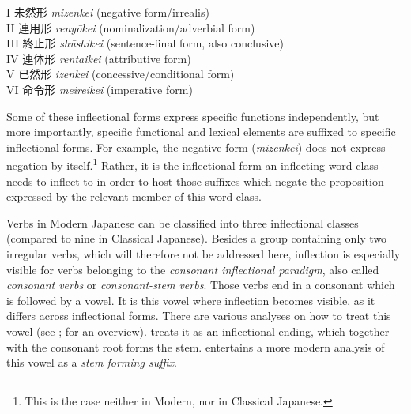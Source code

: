 \documentclass[output=paper,colorlinks,citecolor=brown]{langscibook}
\begin{document}
\begin{exe}
	\ex \label{12ex6}
		I \hspace*{0.6cm} {\japanesefont 未然形} \hspace*{0.6cm} \emph{mizenkei} \hfill (negative form/irrealis) \\
		II \hspace*{0.5cm} {\japanesefont 連用形} \hspace*{0.6cm} \emph{renyōkei} \hfill (nominalization/adverbial form) \\
		III \hspace*{0.4cm} {\japanesefont 終止形} \hspace*{0.6cm} \emph{shūshikei} \hfill (sentence-final form, also conclusive) \\
		IV \hspace*{0.4cm} {\japanesefont 連体形} \hspace*{0.58cm} \emph{rentaikei} \hfill (attributive form) \\
		V \hspace*{0.54cm} {\japanesefont 已然形} \hspace*{0.56cm} \emph{izenkei} \hfill (concessive/conditional form) \\
		VI \hspace*{0.45cm} {\japanesefont 命令形} \hspace*{0.53cm} \emph{meireikei} \hfill (imperative form)
\end{exe}

Some of these inflectional forms express specific functions independently, but more importantly, specific functional and lexical elements are suffixed to specific inflectional forms. For example, the negative form (\emph{mizenkei}) does not express negation by itself.\footnote{This is the case neither in Modern, nor in Classical Japanese.} Rather, it is the inflectional form an inflecting word class needs to inflect to in order to host those suffixes which negate the proposition expressed by the relevant member of this word class.

Verbs in Modern Japanese can be classified into three inflectional classes (compared to nine in Classical Japanese). Besides a group containing only two irregular verbs, which will therefore not be addressed here, inflection is especially visible for verbs belonging to the \emph{consonant inflectional paradigm}, also called \emph{consonant verbs} or \emph{consonant-stem verbs}. Those verbs end in a consonant which is followed by a vowel. It is this vowel where inflection becomes visible, as it differs across inflectional forms. There are various analyses on how to treat this vowel (see \citealt{kuno1973}; \citealt[221--235]{shibatani1990} for an overview). \citet[224]{shibatani1990} treats it as an inflectional ending, which together with the consonant root forms the stem. \citet[ch. 5]{iwasaki2013} entertains a more modern analysis of this vowel as a \emph{stem forming suffix}.
\end{document}
